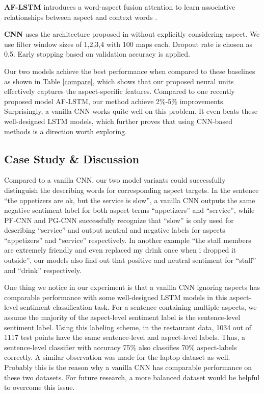 \documentclass[11pt,a4paper]{article}
\begin{document}
\textbf{AF-LSTM} introduces a word-aspect fusion attention to learn associative relationships between aspect and context words \cite{tay2017learning}.

\textbf{CNN} uses the architecture proposed in  \cite{kim2014convolutional} without explicitly considering aspect. We use filter window sizes of 1,2,3,4 with 100 maps each. Dropout rate is chosen as 0.5. Early stopping based on validation accuracy is applied.

Our two models achieve the best performance when compared to these baselines as shown in Table \ref{compare}, which shows that our proposed neural units effectively captures the aspect-specific features. Compared to one recently proposed model AF-LSTM, our method achieve 2\%-5\% improvements. Surprisingly, a vanilla CNN works quite well on this problem. It even beats these well-designed LSTM models, which further proves that using CNN-based methods is a direction worth exploring.
 
 \subsection{Case Study \& Discussion}
 Compared to a vanilla CNN, our two model variants could successfully distinguish the describing words for corresponding aspect targets. In the sentence ``the appetizers are ok, but the service is slow'', a vanilla CNN outputs the same negative sentiment label for both aspect terms ``appetizers'' and ``service'', while PF-CNN and PG-CNN successfully recognize that ``slow'' is only used for describing ``service'' and output neutral and negative labels for aspects ``appetizers'' and ``service'' respectively.
 In another example ``the staff members are extremely friendly and even replaced my drink once when i dropped it outside'', our models also find out that positive and neutral sentiment for ``staff'' and ``drink'' respectively.
 
One thing we notice in our experiment is that a vanilla CNN ignoring aspects has comparable performance with some well-designed LSTM models in this aspect-level sentiment classification task.
For a sentence containing multiple aspects, we assume the majority of the aspect-level sentiment label is the sentence-level sentiment label. Using this labeling scheme, in the restaurant data, 1034 out of 1117 test points have the same sentence-level and aspect-level labels. Thus, a sentence-level classifier with accuracy 75\% also classifies 70\% aspect-labels correctly. A similar observation was made for the laptop dataset as well.
Probably this is the reason why a vanilla CNN has comparable performance on these two datasets. For future research, a more balanced dataset would be helpful to overcome this issue.
\end{document}
